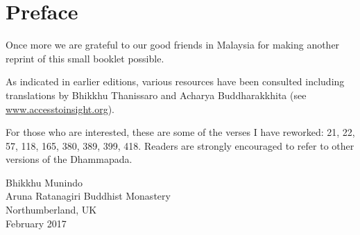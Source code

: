 \chapter[Preface to the fifth edition (2017)]{Preface}

Once more we are grateful to our good friends in Malaysia for making another
reprint of this small booklet possible.

As indicated in earlier editions, various resources have been consulted
including translations by Bhikkhu Thanissaro and Acharya Buddharakkhita 
(see \href{http://accesstoinsight.org}{www.accesstoinsight.org}).

For those who are interested, these are some of the verses I have
reworked: 21, 22, 57, 118, 165, 380, 389, 399, 418. Readers are strongly
encouraged to refer to other versions of the Dhammapada.

\bigskip

{\raggedleft
Bhikkhu Munindo\\
Aruna Ratanagiri Buddhist Monastery\\
Northumberland, UK\\
February 2017
\par}

